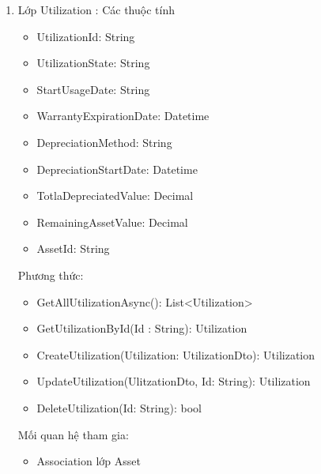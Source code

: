 \begin{enumerate}
\begin{itemize}[label=--]
        \item GetProcurementById(Id : String): Procurement
        \item CreateProcurementAsync(Procurement: ProcurementDto): Procurement
        \item UpdateProcurement(ProcurementDto, Id: String): Procurement
        \item DeleteProcurement(Id: String): bool 
    \end{itemize}
    Mối quan hệ tham gia:
    \begin{itemize}[label=--]
        \item Association với lớp Asset, PurchaseOrder, Suplier
    \end{itemize}
    \item Lớp Utilization :
    Các thuộc tính
    \begin{itemize}[label=--]
        \item UtilizationId: String
        \item UtilizationState: String
        \item StartUsageDate: String
        \item WarrantyExpirationDate: Datetime
        \item DepreciationMethod: String
        \item DepreciationStartDate: Datetime
        \item TotlaDepreciatedValue: Decimal
        \item RemainingAssetValue: Decimal
        \item AssetId: String
    \end{itemize}
    Phương thức:
    \begin{itemize}[label=--]
        \item GetAllUtilizationAsync(): List<Utilization>
        \item GetUtilizationById(Id : String): Utilization
        \item CreateUtilization(Utilization: UtilizationDto): Utilization
        \item UpdateUtilization(UlitzationDto, Id: String): Utilization
        \item DeleteUtilization(Id: String): bool 
    \end{itemize}
    Mối quan hệ tham gia:
    \begin{itemize}[label=--]
        \item Association lớp Asset
    \end{itemize}

\end{enumerate}
